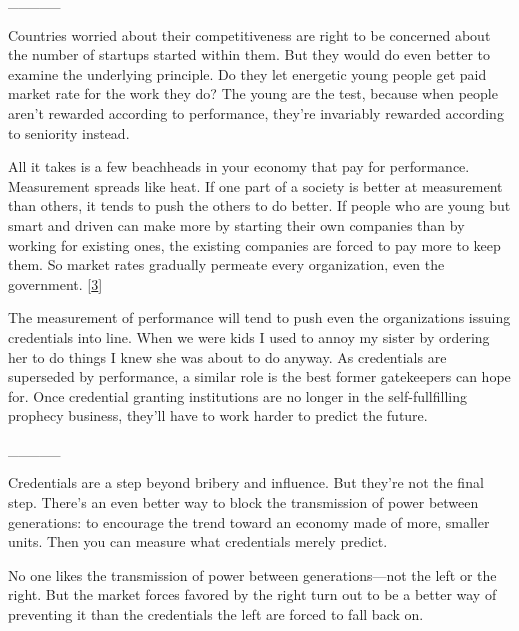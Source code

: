                   \_\_\_\_\_
                  

Countries worried about their competitiveness are
                  right to be concerned about the number of startups started
                  within them. But they would do even better to examine the
                  underlying principle. Do they let energetic young people get
                  paid market rate for the work they do? The young are the test,
                  because when people aren't rewarded according to performance,
                  they're invariably rewarded according to seniority instead.

All
                  it takes is a few beachheads in your economy that pay for
                  performance. Measurement spreads like heat. If one part of a
                  society is better at measurement than others, it tends to push
                  the others to do better. If people who are young but smart and
                  driven can make more by starting their own companies than by
                  working for existing ones, the existing companies are forced
                  to pay more to keep them. So market rates gradually permeate
                  every organization, even the government.
                  [\href{\#f3n}{3}]

The measurement of performance will tend to push
                  even the organizations issuing credentials into line. When we
                  were kids I used to annoy my sister by ordering her to do
                  things I knew she was about to do anyway. As credentials are
                  superseded by performance, a similar role is the best former
                  gatekeepers can hope for. Once credential granting
                  institutions are no longer in the self-fullfilling prophecy
                  business, they'll have to work harder to predict the
                  future.


                  \_\_\_\_\_
                  

Credentials are a step beyond bribery and
                  influence. But they're not the final step. There's an even
                  better way to block the transmission of power between
                  generations: to encourage the trend toward an economy made of
                  more, smaller units. Then you can measure what credentials
                  merely predict.

No one likes the transmission of
                  power between generations---not the left or the right. But
                  the market forces favored by the right turn out to be a better
                  way of preventing it than the credentials the left are forced
                  to fall back on.

